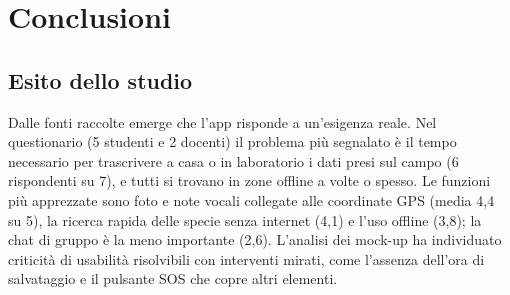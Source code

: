 \section{Conclusioni}

\subsection{Esito dello studio}
Dalle fonti raccolte emerge che l'app risponde a un'esigenza reale. Nel questionario (5 studenti e 2 docenti) il problema più segnalato è il tempo necessario per trascrivere a casa o in laboratorio i dati presi sul campo (6 rispondenti su 7), e tutti si trovano in zone offline a volte o spesso. Le funzioni più apprezzate sono foto e note vocali collegate alle coordinate GPS (media 4,4 su 5), la ricerca rapida delle specie senza internet (4,1) e l'uso offline (3,8); la chat di gruppo è la meno importante (2,6). L'analisi dei mock-up ha individuato criticità di usabilità risolvibili con interventi mirati, come l'assenza dell'ora di salvataggio e il pulsante SOS che copre altri elementi.
